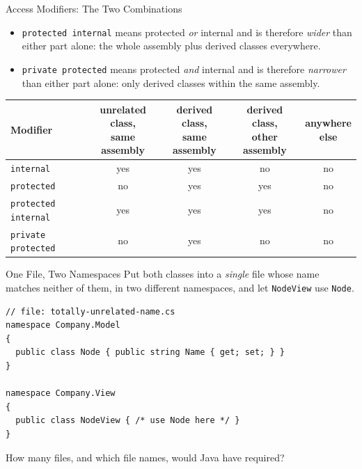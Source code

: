 \begin{frame}{Access Modifiers: The Two Combinations}
  \begin{itemize}
    \item \texttt{protected internal} means protected \emph{or} internal and is
      therefore \emph{wider} than either part alone: the whole assembly plus
      derived classes everywhere.
    \item \texttt{private protected} means protected \emph{and} internal and is
      therefore \emph{narrower} than either part alone: only derived classes
      within the same assembly.
  \end{itemize}
  \vspace{1ex}

  \begin{center}
    \footnotesize
    \begin{tabular}{lcccc}
      \hline
      \textbf{Modifier}
        & \shortstack{unrelated class,\\same assembly}
        & \shortstack{derived class,\\same assembly}
        & \shortstack{derived class,\\other assembly}
        & \shortstack{anywhere\\else}\\
      \hline
      \texttt{internal}           & yes & yes & no  & no\\
      \texttt{protected}          & no  & yes & yes & no\\
      \texttt{protected internal} & yes & yes & yes & no\\
      \texttt{private protected}  & no  & yes & no  & no\\
      \hline
    \end{tabular}
  \end{center}
  \vspace{1ex}

\end{frame}

\begin{exerciseframe}{One File, Two Namespaces}
  Put both classes into a \emph{single} file whose name matches neither of them,
  in two different namespaces, and let \texttt{NodeView} use \texttt{Node}.
  \vspace{1ex}

  \begin{lstlisting}[basicstyle=\scriptsize\ttfamily]
// file: totally-unrelated-name.cs
namespace Company.Model
{
  public class Node { public string Name { get; set; } }
}

namespace Company.View
{
  public class NodeView { /* use Node here */ }
}
  \end{lstlisting}
  \vspace{1ex}

  How many files, and which file names, would Java have required?
\end{exerciseframe}

